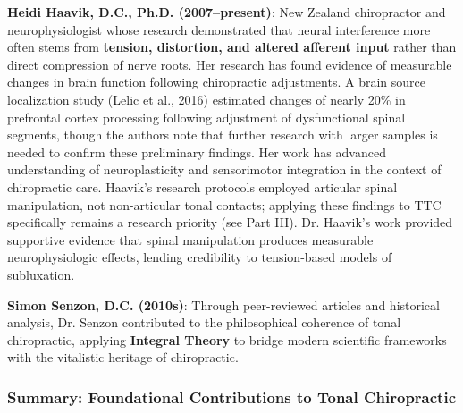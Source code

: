 \documentclass[11pt,letterpaper]{article}
\begin{document}
\textbf{Heidi Haavik, D.C., Ph.D. (2007–present)}: New Zealand chiropractor and neurophysiologist whose research demonstrated that neural interference more often stems from \textbf{tension, distortion, and altered afferent input} rather than direct compression of nerve roots. Her research has found evidence of measurable changes in brain function following chiropractic adjustments. A brain source localization study (Lelic et al., 2016) estimated changes of nearly 20\% in prefrontal cortex processing following adjustment of dysfunctional spinal segments, though the authors note that further research with larger samples is needed to confirm these preliminary findings. Her work has advanced understanding of neuroplasticity and sensorimotor integration in the context of chiropractic care. Haavik's research protocols employed articular spinal manipulation, not non-articular tonal contacts; applying these findings to TTC specifically remains a research priority (see Part III). Dr. Haavik's work provided supportive evidence that spinal manipulation produces measurable neurophysiologic effects, lending credibility to tension-based models of subluxation.


\textbf{Simon Senzon, D.C. (2010s)}: Through peer-reviewed articles and historical analysis, Dr. Senzon contributed to the philosophical coherence of tonal chiropractic, applying \textbf{Integral Theory} to bridge modern scientific frameworks with the vitalistic heritage of chiropractic.


\subsubsection{Summary: Foundational Contributions to Tonal Chiropractic}
\end{document}
